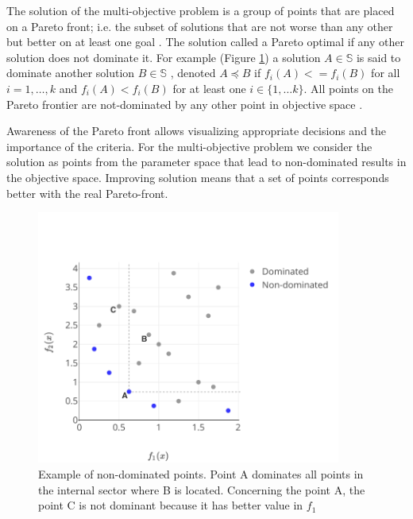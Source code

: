         The solution of the multi-objective problem is a group of points that are placed on a Pareto front; i.e. the subset of solutions that are not worse than any other but better on at least one goal \cite{KrallMD15}. The solution called a Pareto optimal if any other solution does not dominate it. For example (Figure \ref{fig:dominated}) a solution $A \in \mathbb{S}$ is said to dominate another solution $B \in \mathbb{S}$ , denoted $A \preceq B$ if $f_i(A)<=f_i(B)$ for all $i=1, \ldots ,k$ and $f_i(A)<f_i(B)$ for at least one $i \in \{1, \ldots k\}$. All points on the Pareto frontier are not-dominated by any other point in objective space \cite{Kaisa0021267}.  

        Awareness of the Pareto front allows visualizing appropriate decisions and the importance of the criteria. For the multi-objective problem we consider the solution as points from the parameter space that lead to non-dominated results in the objective space. Improving solution means that a set of points corresponds better with the real Pareto-front.

        \begin{figure}
            \centering 
            \includegraphics[width=10cm]{content/images/ndom}
            \caption[Non-dominated points]{Example of non-dominated points. Point A dominates all points in the internal sector where B is located. Concerning the point A, the point C is not dominant because it has better value in $f_1$} 
            \label{fig:dominated} 
        \end{figure}


